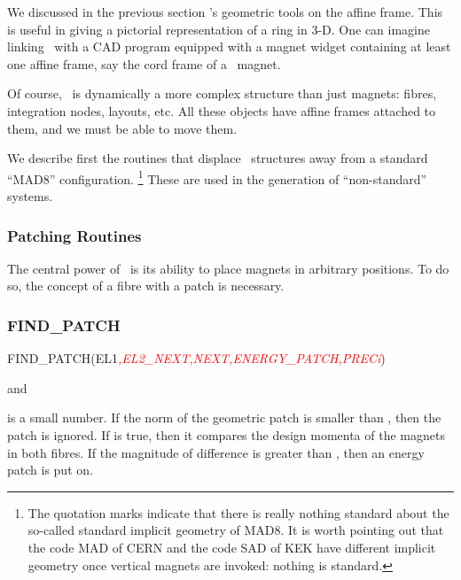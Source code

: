 %
We discussed in the previous section \PTC's geometric tools on the
affine frame. This is useful in giving a pictorial representation of a ring
in 3-D. One can imagine linking \PTC\ with a CAD program equipped
with a magnet widget containing at least one affine frame, say the
cord frame  of a \PTC\ magnet.

Of course, \PTC\ is dynamically a more complex structure than just
magnets: fibres, integration nodes, layouts, etc. All these objects
have affine frames attached to them, and we must be able to move them.

%
We describe first the routines that displace \PTC\ structures away from
a standard ``MAD8'' configuration.%
\footnote{The quotation marks indicate that there is really nothing standard
about the so-called standard implicit geometry of MAD8. It is worth
pointing out that the code MAD of CERN and the code SAD of KEK have
different implicit geometry once vertical magnets are invoked: nothing
is standard.%
} These are used in the generation of ``non-standard'' systems.


\subsubsection{Patching Routines}

%
The central power of \PTC\ is its ability to place magnets in arbitrary
positions. To do so, the concept of a fibre with a patch is necessary.


\subsubsection*{FIND_PATCH}

%
\begin{ptccode}
FIND_PATCH(EL1\textit{\textcolor{red}{,EL2_NEXT,NEXT,ENERGY_PATCH,PRECi}})
\end{ptccode}

 and 

%
 is a small  number.  If the norm of the geometric patch is
smaller than , then the patch is ignored. If  is true,
then it compares the design momenta of the magnets in both fibres. If the magnitude
of difference is greater than , then an energy patch is put on.


